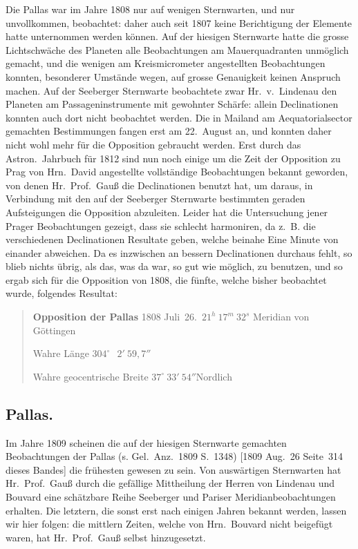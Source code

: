 \documentclass[12pt,a4paper]{book}
\begin{document}
Die Pallas war im Jahre 1808 nur auf wenigen Sternwarten, und nur unvollkommen, beobachtet: daher auch seit 1807 keine Berichtigung der Elemente hatte unternommen werden k\"onnen. Auf der hiesigen Sternwarte hatte die grosse Lichtschw\"ache des Planeten alle Beobachtungen am Mauerquadranten unm\"oglich gemacht, und die wenigen am Kreismicrometer angestellten Beobachtungen konnten, besonderer Umst\"ande wegen, auf grosse Genauigkeit keinen Anspruch machen. Auf der Seeberger Sternwarte beobachtete zwar Hr.~v.~Lindenau den Planeten am Passageninstrumente mit gewohnter Sch\"arfe: allein Declinationen konnten auch dort nicht beobachtet werden. Die in Mailand am Aequatorialsector gemachten Bestimmungen fangen erst am 22.~August an, und konnten daher nicht wohl mehr f\"ur die Opposition gebraucht werden. Erst durch das Astron.~Jahrbuch f\"ur 1812 sind nun noch einige um die Zeit der Opposition zu Prag von Hrn.~David angestellte vollst\"andige Beobachtungen bekannt geworden, von denen Hr.~Prof.~Gau{\ss} die Declinationen benutzt hat, um daraus, in Verbindung mit den auf der Seeberger Sternwarte bestimmten geraden Aufsteigungen die Opposition abzuleiten. Leider hat die Untersuchung jener Prager Beobachtungen gezeigt, dass sie schlecht harmoniren, da z.~B. die verschiedenen Declinationen Resultate geben, welche beinahe Eine Minute von einander abweichen. Da es inzwischen an bessern Declinationen durchaus fehlt, so blieb nichts \"ubrig, als das, was da war, so gut wie m\"oglich, zu benutzen, und so ergab sich f\"ur die Opposition von 1808, die f\"unfte, welche bisher beobachtet wurde, folgendes Resultat:

\begin{quote}
\textbf{Opposition der Pallas} 1808 Juli~26.\ $21^{h}\ 17^{m}\ 32^{s}$ Meridian von G\"ottingen

Wahre L\"ange \dotfill $304^{\circ}\ \phantom{0}2'\ 59{,}7''$

Wahre geocentrische Breite \dotfill $37^{\circ}\ 33'\ 54''$\quad Nordlich
\end{quote}


\newpage
\subsection*{Pallas.}

Im Jahre 1809 scheinen die auf der hiesigen Sternwarte gemachten Beobachtungen der Pallas (s. Gel.~Anz.~1809 S.~1348) [1809 Aug.~26 Seite~314 dieses Bandes] die fr\"uhesten gewesen zu sein. Von ausw\"artigen Sternwarten hat Hr.~Prof.~Gau{\ss} durch die gef\"allige Mittheilung der Herren von Lindenau und Bouvard eine sch\"atzbare Reihe Seeberger und Pariser Meridianbeobachtungen erhalten. Die letztern, die sonst erst nach einigen Jahren bekannt werden, lassen wir hier folgen: die mittlern Zeiten, welche von Hrn.~Bouvard nicht beigef\"ugt waren, hat Hr.~Prof.~Gau{\ss} selbst hinzugesetzt.
\end{document}
